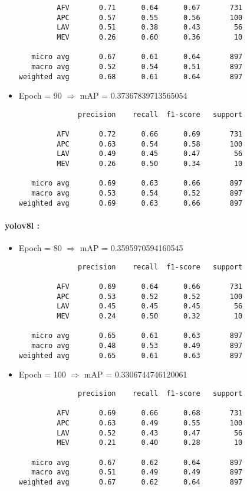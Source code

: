 \begin{itemize}
\begin{verbatim}
         AFV       0.71      0.64      0.67       731
         APC       0.57      0.55      0.56       100
         LAV       0.51      0.38      0.43        56
         MEV       0.26      0.60      0.36        10

   micro avg       0.67      0.61      0.64       897
   macro avg       0.52      0.54      0.51       897
weighted avg       0.68      0.61      0.64       897
    \end{verbatim}

    \item Epoch = 90 $\Rightarrow$ mAP = 0.37367839713565054
          \begin{verbatim}
              precision    recall  f1-score   support

         AFV       0.72      0.66      0.69       731
         APC       0.63      0.54      0.58       100
         LAV       0.49      0.45      0.47        56
         MEV       0.26      0.50      0.34        10

   micro avg       0.69      0.63      0.66       897
   macro avg       0.53      0.54      0.52       897
weighted avg       0.69      0.63      0.66       897
    \end{verbatim}
\end{itemize}

\paragraph{yolov8l :}
\begin{itemize}
    \item Epoch = 80 $\Rightarrow$ mAP = 0.3595970594160545
          \begin{verbatim}
              precision    recall  f1-score   support

         AFV       0.69      0.64      0.66       731
         APC       0.53      0.52      0.52       100
         LAV       0.45      0.45      0.45        56
         MEV       0.24      0.50      0.32        10

   micro avg       0.65      0.61      0.63       897
   macro avg       0.48      0.53      0.49       897
weighted avg       0.65      0.61      0.63       897
    \end{verbatim}

    \item Epoch = 100 $\Rightarrow$ mAP = 0.3306744746120061
          \begin{verbatim}
              precision    recall  f1-score   support

         AFV       0.69      0.66      0.68       731
         APC       0.63      0.49      0.55       100
         LAV       0.52      0.43      0.47        56
         MEV       0.21      0.40      0.28        10

   micro avg       0.67      0.62      0.64       897
   macro avg       0.51      0.49      0.49       897
weighted avg       0.67      0.62      0.64       897
    \end{verbatim}
\end{itemize}



